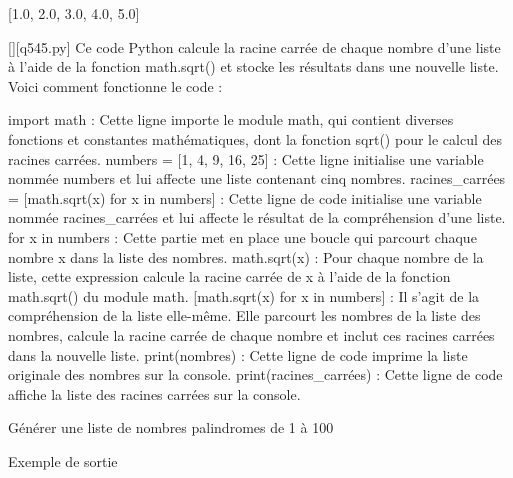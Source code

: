[1.0, 2.0, 3.0, 4.0, 5.0]
        \par
        \begin{solution}
            \renewcommand{\nomfichier}{q545.py}
            \pythonfile{\chemincode \nomfichier}[][\nomfichier]
            Ce code Python calcule la racine carrée de chaque nombre d'une liste à l'aide de la fonction math.sqrt() et stocke les résultats dans une nouvelle liste. Voici comment fonctionne le code :

    import math : Cette ligne importe le module math, qui contient diverses fonctions et constantes mathématiques, dont la fonction sqrt() pour le calcul des racines carrées.
    numbers = [1, 4, 9, 16, 25] : Cette ligne initialise une variable nommée numbers et lui affecte une liste contenant cinq nombres.
    racines_carrées = [math.sqrt(x) for x in numbers] : Cette ligne de code initialise une variable nommée racines_carrées et lui affecte le résultat de la compréhension d'une liste.
        for x in numbers : Cette partie met en place une boucle qui parcourt chaque nombre x dans la liste des nombres.
        math.sqrt(x) : Pour chaque nombre de la liste, cette expression calcule la racine carrée de x à l'aide de la fonction math.sqrt() du module math.
        [math.sqrt(x) for x in numbers] : Il s'agit de la compréhension de la liste elle-même. Elle parcourt les nombres de la liste des nombres, calcule la racine carrée de chaque nombre et inclut ces racines carrées dans la nouvelle liste.
    print(nombres) : Cette ligne de code imprime la liste originale des nombres sur la console.
    print(racines_carrées) : Cette ligne de code affiche la liste des racines carrées sur la console.
        \end{solution}
        

        \question
        Générer une liste de nombres palindromes de 1 à 100

Exemple de sortie

